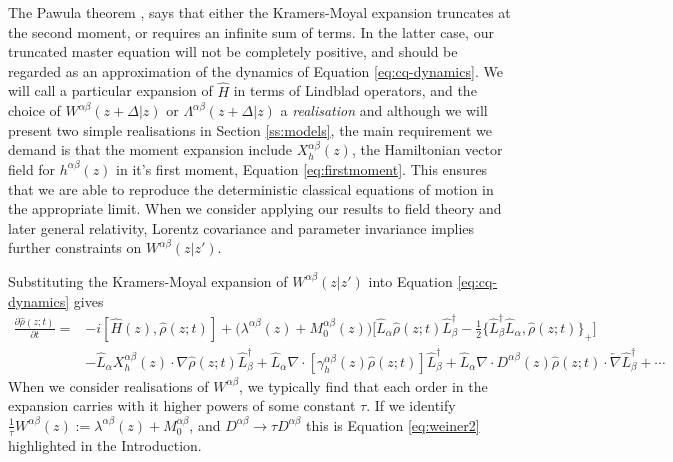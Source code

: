 \documentclass[aps,pra,showpacs,citeautoscript,amsmath,amssymb,floatfix,superscriptaddress,bbm, verbatim,amsfonts,changes,11pt,nofootinbib,longbibliography]{revtex4-2}
\def\X{\Lambda}
\def\z{{z}}
\def\L{{\hat{L}}}
\def\Hq{\hat{H}}
\def\dist{{\Delta}}
\def\rate{{W}}
\def\linrate{{\lambda}}
\def\ab{^{\alpha\beta}}
\newcommand{\M}[1]{M_{#1}\ab}
\renewcommand{\varrho}{\hat{\rho}}
\def\psiz{{\varrho(\z;t)}}
\def\friction{\gamma}
\begin{document}
The Pawula theorem \cite{pawula1967rf}, says that either the Kramers-Moyal expansion truncates at the second moment, or requires an infinite sum of terms.  In the latter case, our truncated master equation will not be completely positive, and should be regarded as an approximation of the dynamics of Equation \eqref{eq:cq-dynamics}.
We will call a particular expansion of $\Hq$ in terms of Lindblad operators, and the choice of $\rate^{\alpha\beta}(\z+\dist|\z)$ or $\X^{\alpha\beta}(\z+\dist|\z)$ a {\it realisation} 
and although we will present two simple realisations in Section \ref{ss:models},
the main requirement we demand is that the moment expansion include $X^{\alpha\beta}_h(\z)$, the Hamiltonian vector field for $h^{\alpha\beta}(\z)$ in it's first moment, Equation \eqref{eq:firstmoment}. This ensures that we are able to reproduce the deterministic classical equations of motion in the appropriate limit. When we consider applying our results to field theory and later general relativity,  Lorentz covariance and parameter invariance implies further constraints on $\rate\ab(\z|\z')$. 

Substituting the Kramers-Moyal expansion of $\rate^{\alpha\beta}(\z|\z')$ into Equation \eqref{eq:cq-dynamics}
gives 
\begin{align}
  \frac{\partial\psiz}{\partial t}=
  &-i[\Hq(\z),\psiz]
 + 
 \big(\linrate\ab(\z) +
  \M{0}(\z)\big)\Big[\L_{\alpha}\psiz\L_{\beta}^\dagger
  -\frac{1}{2}
\{\L_{\beta}^\dagger\L_{\alpha},\psiz\}_+   
\Big]
\nonumber\\
&-
\L_{\alpha}X^{\alpha\beta}_h(\z)\cdot\nabla \psiz\L_{\beta}^\dagger
+ 
\L_{\alpha}\nabla \cdot[\friction\ab_h(\z)\psiz]\L_{\beta}^\dagger
+
\L_{\alpha}
\nabla\cdot D^{\alpha\beta}(\z)\psiz\cdot\overleftarrow{\nabla}\L_{\beta}^\dagger
  +\cdots
  \nonumber
\end{align}
When we consider realisations of $\rate\ab$, we typically find that each order in the expansion carries with it higher powers of some constant $\tau$. If we identify
$\frac{1}{\tau}\rate\ab(\z):=\linrate\ab(\z)+\M{0}$, and $D\ab\rightarrow \tau D\ab$ this is Equation \eqref{eq:weiner2} highlighted in the Introduction.
\end{document}
